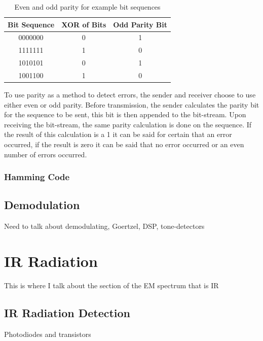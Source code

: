 \begin{table}[H]
	\centering
	\begin{tabular}{ccc}
		\hline
		\multicolumn{1}{l}{\textbf{Bit Sequence}} & \textbf{XOR of Bits} & \multicolumn{1}{l}{\textbf{Odd Parity Bit}} \\ \hline
		0000000 & 0 & 1 \\ \hline
		1111111 & 1 & 0 \\ \hline
		1010101 & 0 & 1 \\ \hline
		1001100 & 1 & 0 \\ \hline
	\end{tabular}
	\caption{Even and odd parity for example bit sequences}
	\label{tbl:party_examples}
\end{table}

 To use parity as a method to detect errors, the sender and receiver choose to use either even or odd parity. Before transmission, the sender calculates the parity bit for the sequence to be sent, this bit is then appended to the bit-stream. Upon receiving the bit-stream, the same parity calculation is done on the sequence. If the result of this calculation is a 1 it can be said for certain that an error occurred, if the result is zero it can be said that no error occurred or an even number of errors occurred.




\subsubsection{Hamming Code}


\subsection{Demodulation}
Need to talk about demodulating, Goertzel, DSP, tone-detectors



\section{IR Radiation}
This is where I talk about the section of the EM spectrum that is IR


\subsection{IR Radiation Detection}

Photodiodes and transistors




